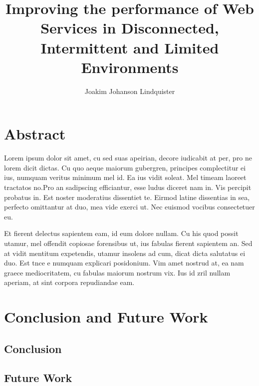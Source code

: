 \documentclass[USenglish]{ifimaster}
\title{Improving the performance of Web Services in Disconnected, Intermittent
and Limited Environments}
\author{Joakim Johanson Lindquister}
\begin{document}
\ififorside{}

\chapter*{Abstract}

Lorem ipsum dolor sit amet, cu sed suas apeirian, decore iudicabit at per, pro
ne lorem dicit dictas. Cu quo aeque maiorum gubergren, principes complectitur ei
ius, numquam veritus minimum mel id. Ea ius vidit soleat. Mel timeam laoreet
tractatos no.Pro an sadipscing efficiantur, esse ludus diceret nam in. Vis
percipit probatus in. Est noster moderatius dissentiet te. Eirmod latine
dissentias in sea, perfecto omittantur at duo, mea vide exerci ut. Nec euismod
vocibus consectetuer eu.

Et fierent delectus sapientem eam, id eum dolore nullam. Cu his quod possit
utamur, mel offendit copiosae forensibus ut, ius fabulas fierent sapientem an.
Sed at vidit mentitum expetendis, utamur insolens ad cum, dicat dicta salutatus
ei duo. Est tnce e numquam explicari posidonium. Vim amet nostrud at, ea nam graece
mediocritatem, cu fabulas maiorum nostrum vix. Ius id zril nullam aperiam, at
sint corpora repudiandae eam.

\tableofcontents
\listoftables
\listoffigures

\pagebreak








\chapter{Conclusion and Future Work}
\section{Conclusion}

\section{Future Work}

\pagebreak
\printbibliography{}
\printglossaries{}
\end{document}
